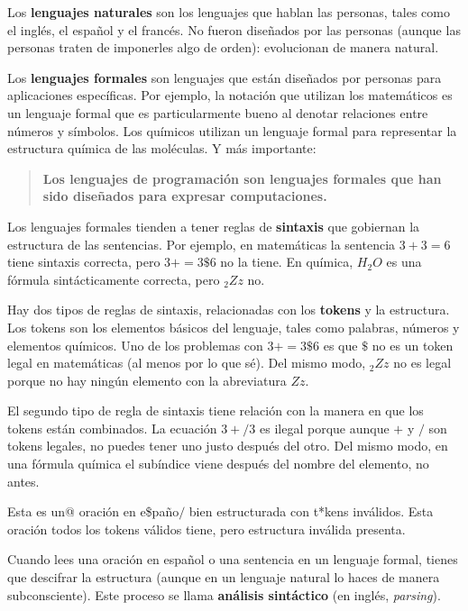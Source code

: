 \documentclass[10pt]{book}
\begin{document}
Los {\bf lenguajes naturales} son los lenguajes que hablan las personas,
tales como el inglés, el español y el francés.  No fueron diseñados
por las personas (aunque las personas traten de imponerles algo de orden):
evolucionan de manera natural.

Los {\bf lenguajes formales} son lenguajes que están diseñados por personas
para aplicaciones específicas.  Por ejemplo, la notación que utilizan los
matemáticos es un lenguaje formal que es particularmente bueno al denotar
relaciones entre números y símbolos.  Los químicos utilizan un lenguaje formal
para representar la estructura química de las moléculas.  Y
más importante:

\begin{quote}
{\bf Los lenguajes de programación son lenguajes formales que han sido
diseñados para expresar computaciones.}
\end{quote}

Los lenguajes formales tienden a tener reglas de {\bf sintaxis} que
gobiernan la estructura de las sentencias.
Por ejemplo, en matemáticas la sentencia
$3 + 3 = 6$ tiene sintaxis correcta, pero
$3 + = 3 \$ 6$ no la tiene.  En química,
$H_2O$ es una fórmula sintácticamente correcta, pero $_2Zz$ no.

Hay dos tipos de reglas de sintaxis, relacionadas con los {\bf tokens} y la
estructura.  Los tokens son los elementos básicos del lenguaje, tales como
palabras, números y elementos químicos.  Uno de los problemas con
$3 += 3 \$ 6$ es que \( \$ \) no es un token legal en matemáticas
(al menos por lo que sé).  Del mismo modo, $_2Zz$ no es legal porque
no hay ningún elemento con la abreviatura $Zz$.

El segundo tipo de regla de sintaxis tiene relación con la manera en que los
tokens están combinados.  La ecuación $3 +/ 3$ es ilegal porque aunque $+$
y $/$ son tokens legales, no puedes tener uno justo después del otro.
Del mismo modo, en una fórmula química el subíndice viene después del nombre
del elemento, no antes.

Esta es un@ oración en e\$paño$/$ bien estructurada
con t*kens inválidos.  Esta oración todos los tokens válidos
tiene, pero estructura inválida presenta.

Cuando lees una oración en español o una sentencia en un lenguaje
formal, tienes que descifrar la estructura
(aunque en un lenguaje natural lo haces de manera subconsciente).  Este
proceso se llama {\bf análisis sintáctico} (en inglés, {\em parsing}).
\end{document}
